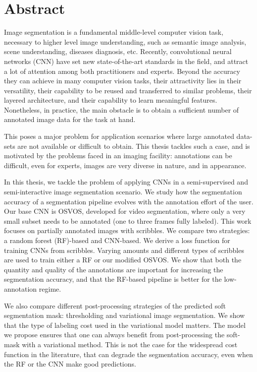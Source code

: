 %

\newpage
\vspace{3cm}

\chapter*{Abstract}

Image segmentation is a fundamental middle-level computer vision task, necessary to higher level image understanding, such as semantic image analysis, scene understanding, diseases diagnosis, etc. Recently, convolutional neural networks (CNN) have set new state-of-the-art standards in the field, and attract a lot of attention among both practitioners and experts. Beyond the accuracy they can achieve in many computer vision tasks, their attractivity lies in their versatility, their capability to be reused and transferred to similar problems, their layered architecture, and their capability to learn meaningful features. Nonetheless, in practice, the main obstacle is to obtain a sufficient number of annotated image data for the task at hand. \par
This poses a major problem for application scenarios where large annotated data-sets are not available or difficult to obtain. This thesis tackles such a case, and is motivated by the problems faced in an imaging facility: annotations can be difficult, even for experts, images are very diverse in nature, and in appearance. \par
In this thesis, we tackle the problem of applying CNNs in a semi-supervised and semi-interactive image segmentation scenario. We study how the segmentation accuracy of a segmentation pipeline evolves with the annotation effort of the user. Our base CNN is OSVOS, developed for video segmentation, where only a very small subset needs to be annotated (one to three frames fully labeled). This work focuses on partially annotated images with scribbles. We compare two strategies: a random forest (RF)-based and CNN-based. We derive a loss function for training CNNs from scribbles. Varying amounts and different types of scribbles are used to train either a RF or our modified OSVOS. We show that both the quantity and quality of the annotations are important for increasing the segmentation accuracy, and that the RF-based pipeline is better for the low-annotation regime. \par
We also compare different post-processing strategies of the predicted soft segmentation mask: thresholding and variational image segmentation. We show that the type of labeling cost used in the variational model matters. The model we propose ensures that one can always benefit from post-processing the soft-mask with a variational method. This is not the case for the widespread cost function in the literature, that can degrade the segmentation accuracy, even when the
RF or the CNN make good predictions.